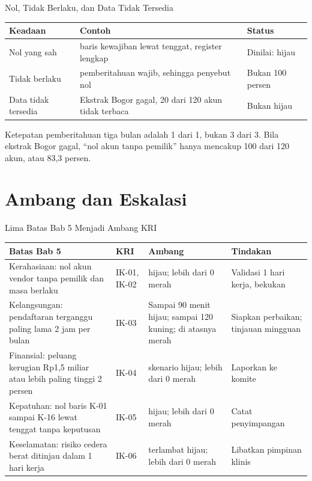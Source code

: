 \documentclass[aspectratio=169, table, 12pt]{beamer}
\begin{document}
\begin{frame}{{\Large Nol, Tidak Berlaku, dan Data Tidak Tersedia}}
  \vspace{4pt}
  \footnotesize
  \begin{tabularx}{\textwidth}{|>{\raggedright\arraybackslash}p{}|>{\raggedright\arraybackslash}X|>{\raggedright\arraybackslash}p{}|}
    \hline
    \textbf{Keadaan} & \textbf{Contoh} & \textbf{Status} \\ \hline
    Nol yang sah & 0 baris kewajiban lewat tenggat, register lengkap & Dinilai: hijau \\ \hline
    Tidak berlaku & 0 pemberitahuan wajib, sehingga penyebut nol & Bukan 100 persen \\ \hline
    Data tidak tersedia & Ekstrak Bogor gagal, 20 dari 120 akun tidak terbaca & Bukan hijau \\
    \hline
  \end{tabularx}

  \vspace{8pt}
  \small Ketepatan pemberitahuan tiga bulan adalah 1 dari 1, bukan 3 dari 3. Bila ekstrak Bogor
  gagal, ``nol akun tanpa pemilik'' hanya mencakup 100 dari 120 akun, atau 83,3 persen.
\end{frame}

\section{Ambang dan Eskalasi}

\begin{frame}{{\Large Lima Batas Bab 5 Menjadi Ambang KRI}}
  \vspace{2pt}
  \scriptsize
  \begin{tabularx}{\textwidth}{|>{\raggedright\arraybackslash}X|>{\raggedright\arraybackslash}p{}|>{\raggedright\arraybackslash}p{}|>{\raggedright\arraybackslash}p{}|}
    \hline
    \textbf{Batas Bab 5} & \textbf{KRI} & \textbf{Ambang} & \textbf{Tindakan} \\ \hline
    Kerahasiaan: nol akun vendor tanpa pemilik dan masa berlaku & IK-01, IK-02 & 0 hijau; lebih
    dari 0 merah & Validasi 1 hari kerja, bekukan \\ \hline
    Kelangsungan: pendaftaran terganggu paling lama 2 jam per bulan & IK-03 & Sampai 90 menit
    hijau; sampai 120 kuning; di atasnya merah & Siapkan perbaikan; tinjauan mingguan \\ \hline
    Finansial: peluang kerugian Rp1,5 miliar atau lebih paling tinggi 2 persen & IK-04 & 0
    skenario hijau; lebih dari 0 merah & Laporkan ke komite \\ \hline
    Kepatuhan: nol baris K-01 sampai K-16 lewat tenggat tanpa keputusan & IK-05 & 0 hijau; lebih
    dari 0 merah & Catat penyimpangan \\ \hline
    Keselamatan: risiko cedera berat ditinjau dalam 1 hari kerja & IK-06 & 0 terlambat hijau;
    lebih dari 0 merah & Libatkan pimpinan klinis \\ \hline
  \end{tabularx}
\end{frame}
\end{document}
